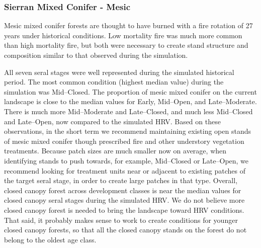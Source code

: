 \subsubsection{Sierran Mixed Conifer - Mesic}
Mesic mixed conifer forests are thought to have burned with a fire rotation of 27 years under historical conditions. Low mortality fire was much more common than high mortality fire, but both were necessary to create stand structure and composition similar to that observed during the simulation. 

All seven seral stages were well represented during the simulated historical period. The most common condition (highest median value) during the simulation was Mid--Closed. The proportion of mesic mixed conifer on the current landscape is close to the median values for Early, Mid--Open, and Late--Moderate. There is much more Mid--Moderate and Late--Closed, and much less Mid--Closed and Late--Open, now compared to the simulated HRV. Based on these observations, in the short term we recommend maintaining existing open stands of mesic mixed conifer though prescribed fire and other understory vegetation treatments. Because patch sizes are much smaller now on average, when identifying stands to push towards, for example, Mid--Closed or Late--Open, we recommend looking for treatment units near or adjacent to existing patches of the target seral stage, in order to create large patches in that type. Overall, closed canopy forest across development classes is near the median values for closed canopy seral stages during the simulated HRV. We do not believe more closed canopy forest is needed to bring the landscape toward HRV conditions. That said, it probably makes sense to work to create conditions for younger closed canopy forests, so that all the closed canopy stands on the forest do not belong to the oldest age class.

